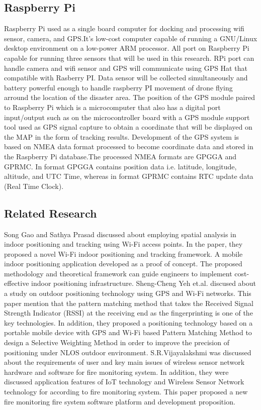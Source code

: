 \documentclass[twocolumn,10pt]{asme2ej}
\begin{document}
	\subsection{Raspberry Pi}
	Raspberry Pi used as a single board computer for docking and processing wifi sensor, camera, and GPS.It's low-cost computer capable of running a GNU/Linux desktop environment on a low-power ARM processor. All port on Raspberry Pi capable for running three sensors that will be used in this research. RPi port can handle camera and wifi sensor and GPS will communicate using GPS Hat that compatible with Rasberry PI. Data sensor will be collected simultaneously and battery powerful enough to handle raspberry PI movement of drone flying arround the location of the disaster area. The position of the GPS module paired to Raspberry Pi which is a microcomputer that also has a digital port input/output such as on the microcontroller board with a GPS module support tool used as GPS signal capture to obtain a coordinate that will be displayed on the MAP in the form of tracking results. Development of the GPS system is based on NMEA data format processed to become coordinate data and stored in the Raspberry Pi database.The processed NMEA formats are GPGGA and GPRMC. In format GPGGA contains position data i.e. latitude, longitude, altitude, and UTC Time, whereas in format GPRMC contains RTC update data (Real Time Clock)\cite{Yuyang}.
	
	\subsection{Related Research}
	Song Gao and Sathya Prasad \cite{Song} discussed about employing spatial analysis in indoor positioning and tracking using Wi-Fi access points. In the paper, they proposed a novel Wi-Fi indoor positioning and tracking framework. A mobile indoor positioning application developed as a proof of concept. The proposed methodology and theoretical framework can guide engineers to implement cost-effective indoor positioning infrastructure. Sheng-Cheng Yeh et.al. \cite{Sheng} discused about a study on outdoor positioning technology using GPS and Wi-Fi networks. This paper mention that the pattern matching method that takes the Received Signal Strength Indicator (RSSI) at the receiving end as the fingerprinting is one of the key technologies. In addition, they proposed a positioning technology based on a portable mobile device with GPS and Wi-Fi based Pattern Matching Method to design a Selective Weighting Method in order to improve the precision of positioning under NLOS outdoor environment. S.R.Vijayalakshmi \cite{Vijayalakshmi} was discussed about the requirements of user and key main issues of wireless sensor network hardware and software for fire monitoring system. In addition, they were discussed application features of IoT technology and Wireless Sensor Network technology for according to fire monitoring system. This paper proposed a new fire monitoring fire system software platform and development proposition.  
	
\end{document}
